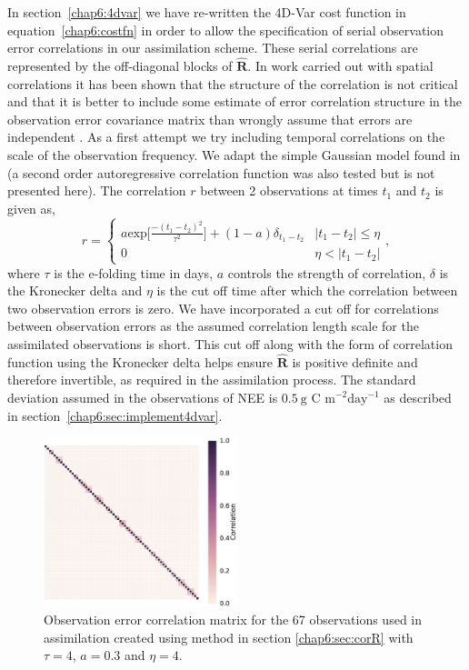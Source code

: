In section~\ref{chap6:4dvar} we have re-written the 4D-Var cost function in equation~\eqref{chap6:costfn} in order to allow the specification of serial observation error correlations in our assimilation scheme. These serial correlations are represented by the off-diagonal blocks of $\hat{\mathbf{R}}$. In work carried out with spatial correlations it has been shown that the structure of the correlation is not critical and that it is better to include some estimate of error correlation structure in the observation error covariance matrix than wrongly assume that errors are independent \citep{Stewart2013, Healy2005}. As a first attempt we try including temporal correlations on the scale of the observation frequency. We adapt the simple Gaussian model found in \citet{jarvinen1999variational} (a second order autoregressive correlation function was also tested but is not presented here). The correlation $r$ between 2 observations at times $t_1$ and $t_2$ is given as,
\begin{equation}
r =
\begin{cases} 
      a \text{exp} \bigg[ \frac{-(t_1 - t_2)^2}{\tau^2} \bigg] + (1- a)\delta_{t_1 - t_2} & |t_1 - t_2| \leq \eta \\
      0 & \eta < |t_1 - t_2| 
   \end{cases}
   , \label{chap6:eqn:corr_fn}
\end{equation}
where $\tau$ is the e-folding time in days, $a$ controls the strength of correlation, $\delta$ is the Kronecker delta and $\eta$ is the cut off time after which the correlation between two observation errors is zero. We have incorporated a cut off for correlations between observation errors as the assumed correlation length scale for the assimilated observations is short. This cut off along with the form of correlation function using the Kronecker delta helps ensure $\hat{\mathbf{R}}$ is positive definite and therefore invertible, as required in the assimilation process. The standard deviation assumed in the observations of NEE is $0.5~\text{g C m}^{-2}\text{day}^{-1}$ as described in section~\ref{chap6:sec:implement4dvar}.

\begin{figure}[ht]
    \centering
    \includegraphics[width=0.5\textwidth]{chapter/chapter6/rcorcor.eps}
    \caption{Observation error correlation matrix for the 67 observations used in assimilation created using method in section \ref{chap6:sec:corR} with $\tau = 4$, $a=0.3$ and $\eta=4$.}
    \label{chap6:fig:Rcorr}
\end{figure}

